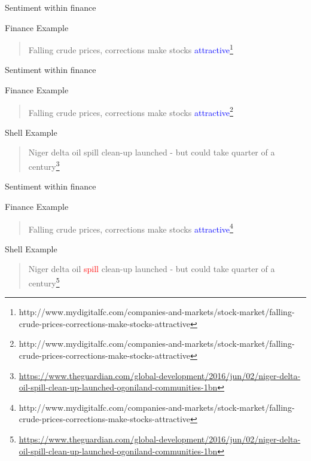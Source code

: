 \documentclass[10pt]{beamer}
\begin{document}
\begin{frame}[fragile]{Sentiment within finance}
  \begin{block}{Finance Example}
    \begin{quote}
Falling crude prices, corrections make stocks \textcolor{blue}{attractive}\footnote{http://www.mydigitalfc.com/companies-and-markets/stock-market/falling-crude-prices-corrections-make-stocks-attractive}
    \end{quote}
  \end{block}
\end{frame}

\begin{frame}[fragile]{Sentiment within finance}
  \begin{block}{Finance Example}
    \begin{quote}
Falling crude prices, corrections make stocks \textcolor{blue}{attractive}\footnote{http://www.mydigitalfc.com/companies-and-markets/stock-market/falling-crude-prices-corrections-make-stocks-attractive}
    \end{quote}
  \end{block}

  \begin{block}{Shell Example}
    \begin{quote}
  Niger delta oil spill clean-up launched - but could take quarter of a century\footnote{\url{https://www.theguardian.com/global-development/2016/jun/02/niger-delta-oil-spill-clean-up-launched-ogoniland-communities-1bn}}
    \end{quote}
  \end{block}
\end{frame}

\begin{frame}[fragile]{Sentiment within finance}
  \begin{block}{Finance Example}
    \begin{quote}
Falling crude prices, corrections make stocks \textcolor{blue}{attractive}\footnote{http://www.mydigitalfc.com/companies-and-markets/stock-market/falling-crude-prices-corrections-make-stocks-attractive}
    \end{quote}
  \end{block}

  \begin{block}{Shell Example}
    \begin{quote}
  Niger delta oil \textcolor{red}{spill} clean-up launched - but could take quarter of a century\footnote{\url{https://www.theguardian.com/global-development/2016/jun/02/niger-delta-oil-spill-clean-up-launched-ogoniland-communities-1bn}}
    \end{quote}
  \end{block}
\end{frame}
\end{document}
